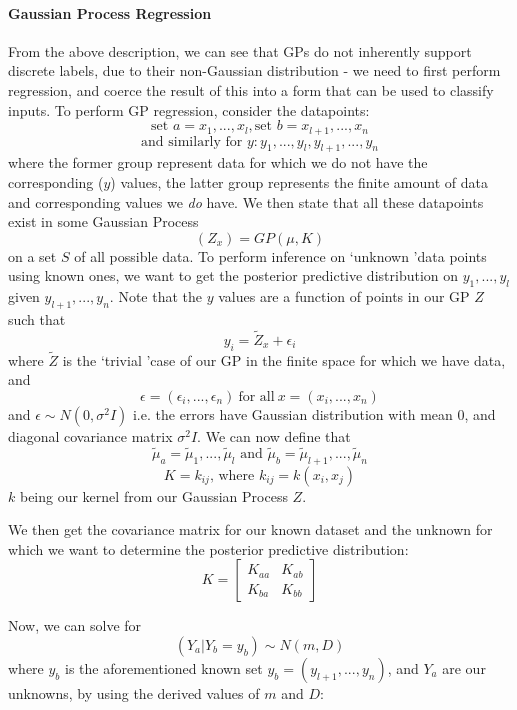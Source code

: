 \documentclass[10pt,sts]{article}
\begin{document}
\begin{multicols}{2}
    \paragraph{Gaussian Process Regression} From the above description, we can see that GPs do not inherently support discrete labels, due to their non-Gaussian distribution - we need to first perform regression, and coerce the result of this into a form that can be used to classify inputs. To perform GP regression, consider the datapoints:
    $$ \textrm{set } a = x_1, ... , x_l, \textrm{set } b = x_{l+1}, ... , x_n $$
    $$ \textrm{and similarly for } y: y_1, ... , y_l, y_{l+1}, ... , y_n $$
    where the former group represent data for which we do not have the corresponding ($y$) values, the latter group represents the finite amount of data and corresponding values we \textit{do} have. We then state that all these datapoints exist in some Gaussian Process $$ (Z_x) = GP(\mu, K) $$ on a set $S$ of all possible data. To perform inference on \lq unknown \rq data points using known ones, we want to get the posterior predictive distribution on $y_1, ... , y_l$ given $y_{l+1}, ... , y_n$. Note that the $y$ values are a function of points in our GP $Z$ such that $$y_i = \widetilde{Z}_x + \epsilon_i$$ where $\widetilde{Z}$ is the \lq trivial \rq case of our GP in the finite space for which we have data, and $$\epsilon = (\epsilon_i, ... , \epsilon_n) \ \textrm{for all} \ x = (x_i, ... , x_n)$$ and $\epsilon \sim N(0, \sigma^2I)$ i.e. the errors have Gaussian distribution with mean 0, and diagonal covariance matrix $\sigma^2I$. We can now define that $$\widetilde{\mu}_{a} = \widetilde{\mu}_{1} ,..., \widetilde{\mu}_{l} \textrm{ and } \widetilde{\mu}_{b} = \widetilde{\mu}_{l+1} ,..., \widetilde{\mu}_{n}$$ 
    $$ K = k_{ij} \textrm{, where } k_{ij} = k(x_i, x_j) $$
    $k$ being our kernel from our Gaussian Process $Z$. 

    We then get the covariance matrix for our known dataset and the unknown for which we want to determine the posterior predictive distribution:
    $$ K = 
    \begin{bmatrix}
        K_{aa} & K_{ab} \\
        K_{ba} & K_{bb} 
    \end{bmatrix}
    $$

    \pagebreak
    Now, we can solve for $$(Y_a | Y_b = y_b) \sim N(m, D)$$
    where $y_b$ is the aforementioned known set $y_b = (y_{l+1}, ... , y_{n})$, and $Y_a$ are our unknowns, by using the derived values of $m$ and $D$:


\end{multicols}
\end{document}
